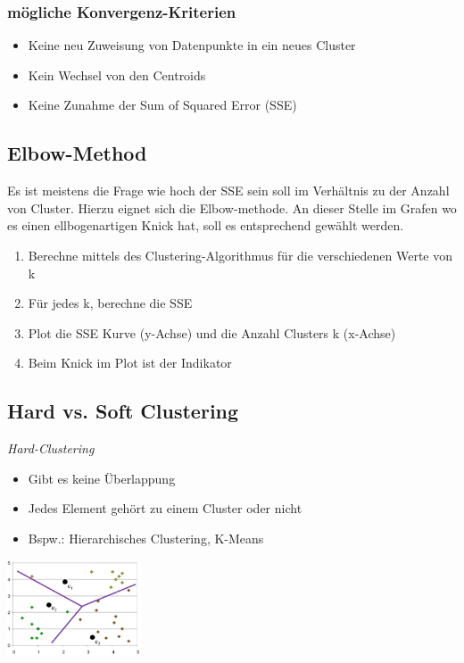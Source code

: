 \documentclass{article}
\newenvironment{Figure}
	{\par\medskip\noindent\minipage{\linewidth}}
	{\endminipage\par\medskip}
\theoremstyle{merke}
\theoremstyle{definition}
\begin{document}
            \subsubsection{mögliche Konvergenz-Kriterien}
            \begin{itemize}
                \item Keine neu Zuweisung von Datenpunkte in ein neues Cluster
                \item Kein Wechsel von den Centroids
                \item Keine Zunahme der Sum of Squared Error (SSE)
            \end{itemize}

        \subsection{Elbow-Method}
        Es ist meistens die Frage wie hoch der SSE sein soll im Verhältnis zu der Anzahl von Cluster. Hierzu eignet sich die Elbow-methode. An dieser Stelle im Grafen wo es einen ellbogenartigen Knick hat, soll es entsprechend gewählt werden.
        \begin{enumerate}
            \item Berechne mittels des Clustering-Algorithmus für die verschiedenen Werte von k
            \item Für jedes k, berechne die SSE
            \item Plot die SSE Kurve (y-Achse) und die Anzahl Clusters k (x-Achse)
            \item Beim Knick im Plot ist der Indikator
        \end{enumerate}

        \subsection{Hard vs. Soft Clustering}
        \textit{Hard-Clustering}
        \begin{itemize}
            \item Gibt es keine Überlappung
            \item Jedes Element gehört zu einem Cluster oder nicht
            \item Bspw.: Hierarchisches Clustering, K-Means
        \end{itemize}
        \begin{Figure}
        \centering
        \includegraphics[width=150px]{img/HardClustering.png}
            \label{fig:Grafik bei einem Hard Clustering}
        \end{Figure}
\end{document}
